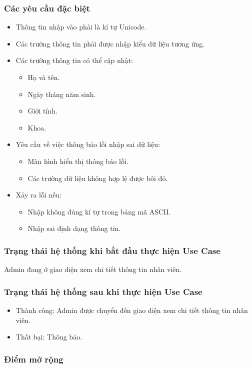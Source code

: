 \subsubsection{Các yêu cầu đặc biệt}
\begin{itemize}
  \item Thông tin nhập vào phải là kí tự Unicode.
  \item Các trường thông tin phải được nhập kiểu dữ liệu tương ứng.
  \item Các trường thông tin có thể cập nhật:
    \begin{itemize}
      \item Họ và tên.
      \item Ngày tháng năm sinh.
      \item Giới tính.
      \item Khoa.
    \end{itemize}
  \item Yêu cầu về việc thông báo lỗi nhập sai dữ liệu:
    \begin{itemize}
      \item Màn hình hiển thị thông báo lỗi.
      \item Các trường dữ liệu không hợp lệ được bôi đỏ.
    \end{itemize}
  \item Xảy ra lỗi nếu:
    \begin{itemize}
      \item Nhập không đúng kí tự trong bảng mã ASCII.
      \item Nhập sai định dạng thông tin.
    \end{itemize}
\end{itemize}

\subsubsection{Trạng thái hệ thống khi bắt đầu thực hiện Use Case}
Admin đang ở giao diện xem chi tiết thông tin nhân viên.

\subsubsection{Trạng thái hệ thống sau khi thực hiện Use Case}
\begin{itemize}
  \item Thành công: Admin được chuyển đến giao diện xem chi tiết thông tin nhân viên.
  \item Thất bại: Thông báo.
\end{itemize}

\subsubsection{Điểm mở rộng}
